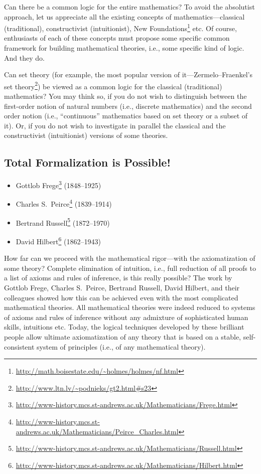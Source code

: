 Can there be a common logic for the entire mathematics?
To avoid the absolutist approach, let us appreciate all the existing concepts of mathematics---classical (traditional), constructivist (intuitionist), New Foundations\footnote{\url{http://math.boisestate.edu/~holmes/holmes/nf.html}} etc.
Of course, enthusiasts of each of these concepts must propose some specific common framework for building mathematical theories, i.e., some specific kind of logic.
And they do.

Can set theory (for example, the most popular version of it---Zermelo--Fraenkel's set theory\footnote{\url{http://www.ltn.lv/~podnieks/gt2.html\#s23}}) be viewed as a common logic for the classical (traditional) mathematics?
You may think so, if you do not wish to distinguish between the first-order notion of natural numbers (i.e., discrete mathematics) and the second order notion (i.e., ``continuous'' mathematics based on set theory or a subset of it).
Or, if you do not wish to investigate in parallel the classical and the constructivist (intuitionist) versions of some theories.

\subsection{Total Formalization is Possible!}
\begin{itemize}
    \item Gottlob Frege\footnote{\url{http://www-history.mcs.st-andrews.ac.uk/Mathematicians/Frege.html}} (1848--1925)
    \item Charles S.\ Peirce\footnote{\url{http://www-history.mcs.st-andrews.ac.uk/Mathematicians/Peirce\_Charles.html}} (1839--1914)
    \item Bertrand Russell\footnote{\url{http://www-history.mcs.st-andrews.ac.uk/Mathematicians/Russell.html}} (1872--1970)
    \item David Hilbert\footnote{\url{http://www-history.mcs.st-andrews.ac.uk/Mathematicians/Hilbert.html}} (1862--1943)
\end{itemize}

How far can we proceed with the mathematical rigor---with the axiomatization of some theory?
Complete elimination of intuition, i.e., full reduction of all proofs to a list of axioms and rules of inference, is this really possible?
The work by Gottlob Frege, Charles S.\ Peirce, Bertrand Russell, David Hilbert, and their colleagues showed how this can be achieved even with the most complicated mathematical theories.
All mathematical theories were indeed reduced to systems of axioms and rules of inference without any admixture of sophisticated human skills, intuitions etc.
Today, the logical techniques developed by these brilliant people allow ultimate axiomatization of any theory that is based on a stable, self-consistent system of principles (i.e., of any mathematical theory).

